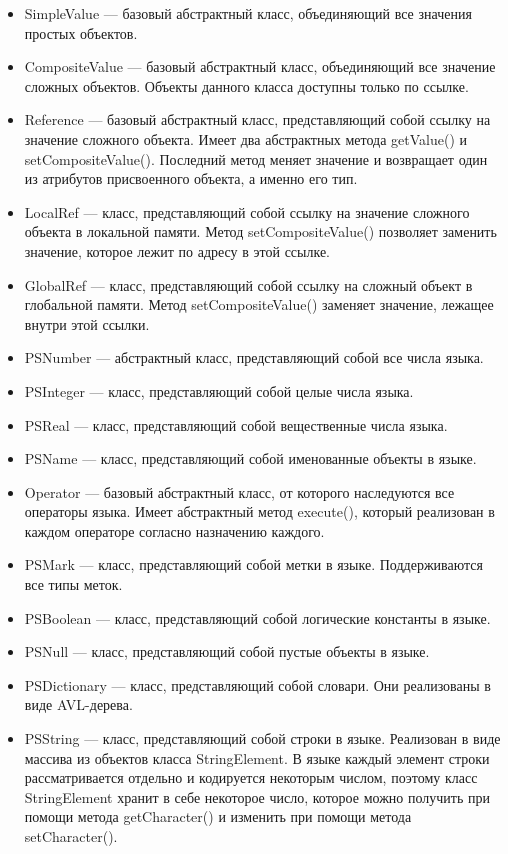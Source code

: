 \begin{itemize}
\item SimpleValue ---  базовый абстрактный класс, объединяющий все значения простых объектов.
\item CompositeValue --- базовый абстрактный класс, объединяющий все значение сложных объектов. Объекты данного класса доступны только по ссылке.
\item Reference --- базовый абстрактный класс, представляющий собой ссылку на значение сложного объекта. Имеет два абстрактных метода getValue() и setCompositeValue(). Последний метод меняет значение и возвращает один из атрибутов присвоенного объекта, а именно его тип.
\item LocalRef ---  класс, представляющий собой ссылку на значение сложного объекта в локальной памяти. Метод setCompositeValue() позволяет заменить значение, которое лежит по адресу в этой ссылке.
\item GlobalRef ---  класс, представляющий собой ссылку на сложный объект в глобальной памяти. Метод setCompositeValue() заменяет значение, лежащее внутри этой ссылки.
\item PSNumber --- абстрактный класс, представляющий собой все числа языка.
\item PSInteger --- класс, представляющий собой целые числа языка.
\item PSReal --- класс, представляющий собой вещественные числа языка.
\item PSName ---  класс, представляющий собой именованные объекты в языке.
\item Operator --- базовый абстрактный класс, от которого наследуются все операторы языка. Имеет абстрактный метод execute(), который реализован в каждом операторе согласно назначению каждого.
\item PSMark ---  класс, представляющий собой метки в языке. Поддерживаются все типы меток.
\item PSBoolean ---  класс, представляющий собой логические константы в языке.
\item PSNull ---  класс, представляющий собой пустые объекты в языке.
\item PSDictionary ---  класс, представляющий собой словари. Они реализованы в виде AVL-дерева.
\item PSString ---  класс, представляющий собой строки в языке. Реализован в виде массива из объектов класса StringElement. В языке каждый элемент строки рассматривается отдельно и кодируется некоторым числом, поэтому класс StringElement хранит в себе некоторое число, которое можно получить при помощи метода getCharacter() и изменить при помощи метода setCharacter().

\end{itemize}
